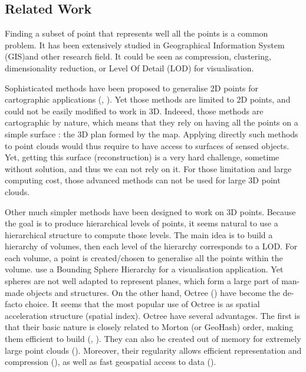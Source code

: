 	
	
\subsection{Related Work} 

	Finding a subset of point that represents well all the points is a common problem.
	It has been extensively studied in Geographical Information System (GIS)and other research field.
	It could be seen as compression, clustering, dimensionality reduction, or Level Of Detail (LOD) for visualisation.
	

	Sophisticated methods have been proposed to generalise 2D points for cartographic applications (\cite{Sester2001}, \cite{Schwartges2013}).
	Yet those methods are limited to 2D points, and could not be easily modified to work in 3D.
	Indeeed, those methods are cartographic by nature, which means that they rely on having all the points on a simple surface : the 3D plan formed by the map.
	Applying directly such methods to point clouds would thus require to have access to surfaces of sensed objects.
	Yet, getting this surface (reconstruction) is a very hard challenge, sometime without solution, and thus we can not rely on it.
	For those limitation and large computing cost, those advanced methods can not be used for large 3D point clouds. 
	
	
	Other much simpler methods have been designed to work on 3D points. 
	Because the goal is to produce hierarchical levels of points, it seems natural to use a hierarchical structure to compute those levels.
	The main idea is to build a hierarchy of volumes, then each level of the hierarchy corresponds to a LOD. For each volume, a point is created/chosen to generalise all the points within the volume.
	\cite{Rusinkiewicz2000} use a Bounding Sphere Hierarchy for a visualisation application.
	Yet spheres are not well adapted to represent planes, which form a large part of man-made objects and structures.
	On the other hand, Octree (\cite{Meagher1982}) have become the de-facto choice.
	It seems that the most popular use of Octree is as spatial acceleration structure (spatial index).
	Octree have several advantages.
	The first is that their basic nature is closely related to Morton (or GeoHash) order,
	making them efficient to build (\cite{Sabo2014}, \cite{Feng2014}).
	They can also be created out of memory for extremely large point clouds (\cite{Baert2014}). 
	Moreover, their regularity allows efficient representation and compression (\cite{Schnabel2006,Huang2006}), as well as fast geospatial access to data (\cite{Elseberg2013}).

